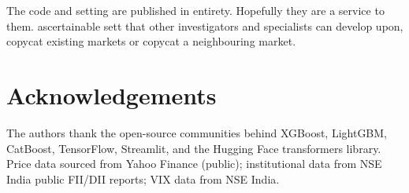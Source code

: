 \documentclass[10pt,a4paper,twoside]{article}
\begin{document}
The code and setting are published in entirety. Hopefully they are a service to them.
ascertainable sett that other investigators and specialists can develop upon,
copycat existing markets or copycat a neighbouring market.

\section*{Acknowledgements}

The authors thank the open-source communities behind XGBoost, LightGBM,
CatBoost, TensorFlow, Streamlit, and the Hugging Face transformers library.
Price data sourced from Yahoo Finance (public); institutional data from
NSE India public FII/DII reports; VIX data from NSE India.



\end{document}
